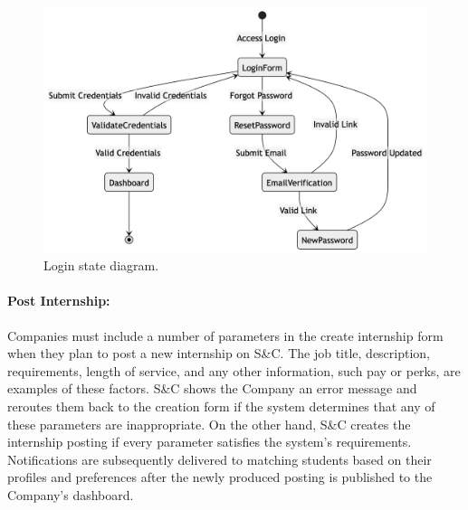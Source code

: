 \begin{figure}[H]
    \begin{center}
        \includegraphics[width=1\linewidth]{JhaBhatiaSharma/Images/State Diagrams/LoginState.png}
        \caption{Login state diagram.}
        \label{fig:login_sd}%
    \end{center}
\end{figure}

\newpage

\paragraph{Post Internship:}
Companies must include a number of parameters in the create internship form when they plan to post a new internship on S\&C. The job title, description, requirements, length of service, and any other information, such pay or perks, are examples of these factors. S\&C shows the Company an error message and reroutes them back to the creation form if the system determines that any of these parameters are inappropriate.
On the other hand, S\&C creates the internship posting if every parameter satisfies the system's requirements. Notifications are subsequently delivered to matching students based on their profiles and preferences after the newly produced posting is published to the Company's dashboard.

